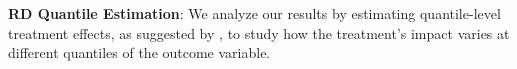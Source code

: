 


\vskip 1cm

\textbf{RD Quantile Estimation}: We analyze our results by estimating quantile-level treatment effects, as suggested by \cite{FRANDSEN2012}, to study how the treatment’s impact varies at different quantiles of the outcome variable. 


